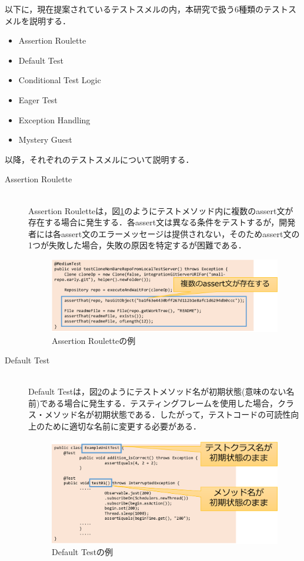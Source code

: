 \documentclass[12pt]{jarticle} %
\begin{document}
以下に，現在提案されているテストスメルの内，本研究で扱う6種類のテストスメルを説明する．

\begin{itemize}
\item Assertion Roulette
\item Default Test
\item Conditional Test Logic
\item Eager Test
\item Exception Handling
\item Mystery Guest
\end{itemize}

以降，それぞれのテストスメルについて説明する．

\begin{description}
\item[Assertion Roulette]~\\
Assertion Rouletteは，図\ref{AR}のようにテストメソッド内に複数のassert文が存在する場合に発生する．各assert文は異なる条件をテストするが，開発者には各assert文のエラーメッセージは提供されない，そのためassert文の1つが失敗した場合，失敗の原因を特定するが困難である．

\begin{figure}[h]
\begin{center}
\includegraphics[clip,width=15cm]{image/AR.pdf}
\caption{Assertion Rouletteの例}
\label{AR}
\end{center}
\end{figure}

\item[Default Test]~\\
Default Testは，図\ref{DT}のようにテストメソッド名が初期状態(意味のない名前)である場合に発生する．テスティングフレームを使用した場合，クラス・メソッド名が初期状態である．したがって，テストコードの可読性向上のために適切な名前に変更する必要がある．


\begin{figure}[h]
\begin{center}
\includegraphics[clip,width=15cm]{image/DT.pdf}
\caption{Default Testの例}
\label{DT}
\end{center}
\end{figure}


\end{description}
\end{document}
